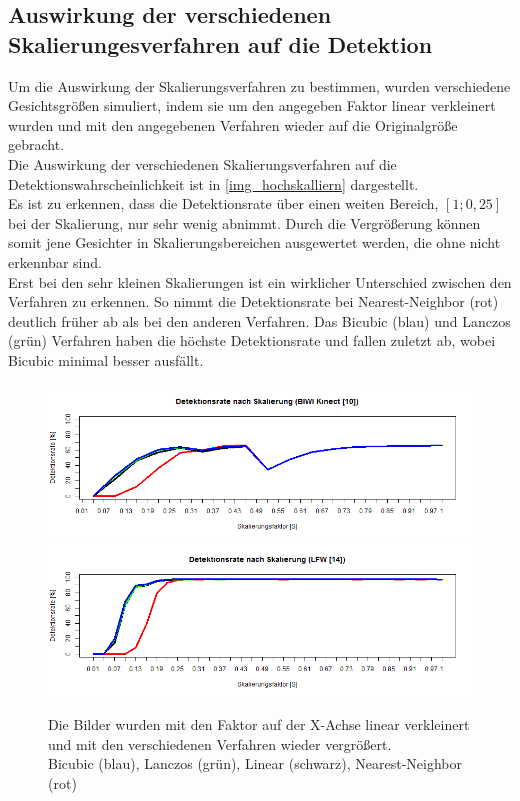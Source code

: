 \subsection{Auswirkung der verschiedenen Skalierungesverfahren auf die Detektion}
\label{OpenFace_skal}
Um die Auswirkung der Skalierungsverfahren zu bestimmen, wurden verschiedene Gesichtsgrößen simuliert, indem sie um den angegeben Faktor linear verkleinert wurden und mit den angegebenen Verfahren wieder auf die Originalgröße gebracht.\\
Die Auswirkung der verschiedenen Skalierungsverfahren auf die Detektionswahrscheinlichkeit ist in \autoref{img_hochskalliern} dargestellt.\\
Es ist zu erkennen, dass die Detektionsrate über einen weiten Bereich, $[1;0,25]$ bei der Skalierung, nur sehr wenig abnimmt. Durch die Vergrößerung können somit jene Gesichter in Skalierungsbereichen ausgewertet werden, die ohne nicht erkennbar sind.\\
Erst bei den sehr kleinen Skalierungen ist ein wirklicher Unterschied zwischen den Verfahren zu erkennen. So nimmt die Detektionsrate bei  Nearest-Neighbor (rot) deutlich früher ab als bei den anderen Verfahren. Das Bicubic (blau) und Lanczos (grün) Verfahren haben die höchste Detektionsrate und fallen zuletzt ab, wobei Bicubic minimal besser ausfällt.
\begin{figure}
	\centering
	\includegraphics[width=\linewidth]{img_Skalierung/Resize_Rate_Ges}\\
	\includegraphics[width=\linewidth]{img_Skalierung/Resize_Rate_lfw}
	\caption{Die Bilder wurden mit den Faktor auf der X-Achse linear verkleinert und mit den verschiedenen Verfahren wieder vergrößert.\\
		Bicubic (blau), Lanczos (grün), Linear (schwarz), Nearest-Neighbor (rot)}
	\label{img_hochskalliern}
\end{figure}
